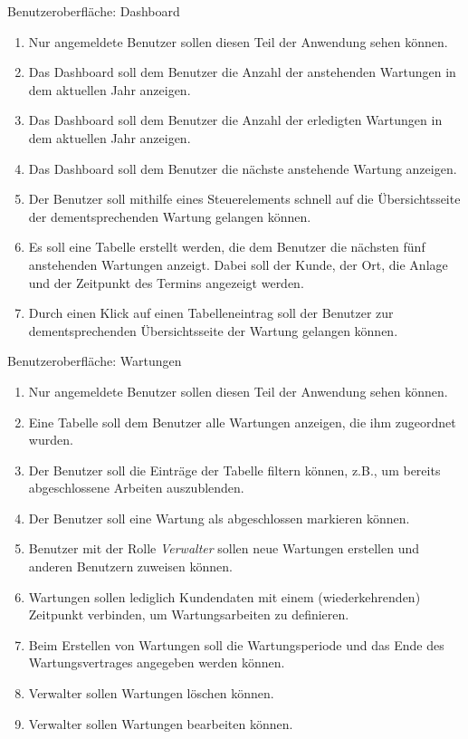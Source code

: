 \documentclass[12pt]{scrreprt}
\newcommand{\itemh}[1]{{\bfseries\large\item #1}}
\begin{document}
\begin{enumerate}
    \itemh{Benutzeroberfläche: Dashboard}
    \begin{enumerate}
      \item Nur angemeldete Benutzer sollen diesen Teil der Anwendung sehen können.
      \item Das Dashboard soll dem Benutzer die Anzahl der anstehenden Wartungen in dem aktuellen Jahr anzeigen.
      \item Das Dashboard soll dem Benutzer die Anzahl der erledigten Wartungen in dem aktuellen Jahr anzeigen.
      \item Das Dashboard soll dem Benutzer die nächste anstehende Wartung anzeigen.
      \item Der Benutzer soll mithilfe eines Steuerelements schnell auf die Übersichtsseite der dementsprechenden
        Wartung gelangen können.
      \item Es soll eine Tabelle erstellt werden, die dem Benutzer die nächsten fünf anstehenden Wartungen anzeigt.
        Dabei soll der Kunde, der Ort, die Anlage und der Zeitpunkt des Termins angezeigt werden.
      \item Durch einen Klick auf einen Tabelleneintrag soll der Benutzer zur dementsprechenden Übersichtsseite der
        Wartung gelangen können.
    \end{enumerate}

    \itemh{Benutzeroberfläche: Wartungen}
    \begin{enumerate}
      \item Nur angemeldete Benutzer sollen diesen Teil der Anwendung sehen können.
      \item Eine Tabelle soll dem Benutzer alle Wartungen anzeigen, die ihm zugeordnet wurden.
      \item Der Benutzer soll die Einträge der Tabelle filtern können, z.B., um bereits abgeschlossene Arbeiten
        auszublenden.
      \item Der Benutzer soll eine Wartung als abgeschlossen markieren können.
      \item Benutzer mit der Rolle \textit{Verwalter} sollen neue Wartungen erstellen und anderen Benutzern zuweisen
        können.
      \item Wartungen sollen lediglich Kundendaten mit einem (wiederkehrenden) Zeitpunkt verbinden, um
        Wartungsarbeiten zu definieren.
      \item Beim Erstellen von Wartungen soll die Wartungsperiode und das Ende des Wartungsvertrages angegeben werden können.
      \item Verwalter sollen Wartungen löschen können.
      \item Verwalter sollen Wartungen bearbeiten können.
    \end{enumerate}


\end{enumerate}
\end{document}
